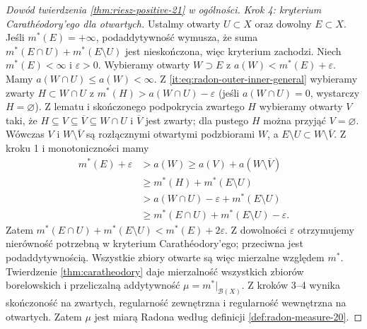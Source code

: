 \begin{proof}[Dowód twierdzenia \ref{thm:riesz-positive-21} w ogólności]
\emph{Krok 4: kryterium Carathéodory'ego dla otwartych.}
Ustalmy otwarty $U\subset X$ oraz dowolny $E\subset X$. Jeśli $m^*(E)=+\infty$, podaddytywność wymusza, że suma $m^*(E\cap U)+m^*(E\setminus U)$ jest nieskończona, więc kryterium zachodzi. Niech $m^*(E)<\infty$ i $\varepsilon>0$. Wybieramy otwarty $W\supset E$ z $a(W)<m^*(E)+\varepsilon$. Mamy $a(W\cap U)\le a(W)<\infty$. Z \eqref{it:eq:radon-outer-inner-general} wybieramy zwarty $H\subset W\cap U$ z
$m^*(H)>a(W\cap U)-\varepsilon$ (jeśli $a(W\cap U)=0$, wystarczy $H=\varnothing$). Z lematu  i skończonego podpokrycia zwartego $H$ wybieramy otwarty $V$ taki, że $H\subseteq V\subseteq\overline V\subseteq W\cap U$ i $\overline V$ jest zwarty; dla pustego $H$ można przyjąć $V=\varnothing$. Wówczas $V$ i $W\setminus\overline V$ są rozłącznymi otwartymi podzbiorami $W$, a $E\setminus U\subset W\setminus\overline V$. Z kroku 1 i monotoniczności mamy
\begin{align*}
 m^*(E)+\varepsilon
 &>a(W)\ge a(V)+a(W\setminus\overline V)\\
 &\ge m^*(H)+m^*(E\setminus U)\\
 &>a(W\cap U)-\varepsilon+m^*(E\setminus U)\\
 &\ge m^*(E\cap U)+m^*(E\setminus U)-\varepsilon .
\end{align*}
Zatem $m^*(E\cap U)+m^*(E\setminus U)<m^*(E)+2\varepsilon$. Z dowolności $\varepsilon$ otrzymujemy nierówność potrzebną w kryterium Carathéodory'ego; przeciwna jest podaddytywnością. Wszystkie zbiory otwarte są więc mierzalne względem $m^*$. Twierdzenie \ref{thm:caratheodory} daje mierzalność wszystkich zbiorów borelowskich i przeliczalną addytywność $\mu=m^*|_{\mathcal B(X)}$. Z kroków 3--4 wynika skończoność na zwartych, regularność zewnętrzna i regularność wewnętrzna na otwartych. Zatem $\mu$ jest miarą Radona według definicji \ref{def:radon-measure-20}.


\end{proof}
